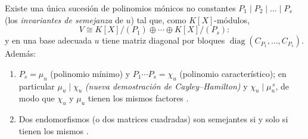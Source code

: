 \begin{theorem}
\label{thm:b3:modules:frobenius}
Existe una única sucesión de polinomios mónicos no constantes $P_1
\mid P_2 \mid \dots \mid P_s$ (los \emph{invariantes de
semejanza} de $u$) tal que, como
$K[X]$-módulos,
\[
V \cong K[X]/(P_1) \oplus \cdots \oplus K[X]/(P_s):
\]
y en una base adecuada $u$ tiene matriz diagonal por bloques
$\operatorname{diag}(C_{P_1}, \dots, C_{P_s})$. Además:
\begin{enumerate}
  \item $P_s = \mu_u$ (polinomio mínimo) y $P_1\cdots P_s =
        \chi_u$ (polinomio característico); en particular $\mu_u
        \mid \chi_u$ \emph{(nueva demostración de Cayley--Hamilton)} y
  $\chi_u \mid \mu_u^{\,s}$, de modo que $\chi_u$ y $\mu_u$ tienen los
  mismos factores .
  \item Dos endomorfismos (o dos matrices cuadradas) son semejantes si y
  solo si tienen los mismos
  .
\end{enumerate}
\end{theorem}

